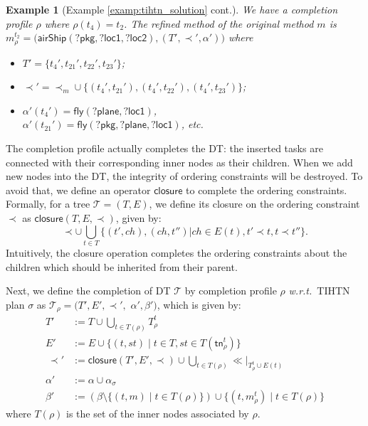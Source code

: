 \documentclass[letterpaper]{article} %
\newtheorem{examp}{Example}
\newcommand{\tn}{\mathsf{tn}}
\newcommand{\plan}{\sigma}
\newcommand{\Dtree}{\mathcal{T}}
\newcommand{\Tasksof}{T}
\newcommand{\aspprec}{\ll}
\newcommand{\improveFunction}{\rho}
\newcommand{\closure}{\mathsf{closure}}
\begin{document}
\begin{examp}[Example \ref{examp:tihtn_solution} cont.]
We have a completion profile $\improveFunction$ where $\improveFunction(t_4)\!=\!t_2$. %
The refined method of the original method $m$ is $m_\improveFunction^{t_2}{=}\mathsf{(airShip(?pkg{,}?loc1{,}?loc2)},(T'{,}{\prec}'{,}\alpha'))$ where
\begin{itemize}
\item $T' = \{t_4',t_{21}',t_{22}',t_{23}'\}$;
\item $\prec' = \prec_m \cup \{(t_4',t_{21}'),(t_4',t_{22}'),(t_4',t_{23}')\}$;
\item $\alpha'(t_4') = \mathsf{fly(?plane,?loc1)}$,\\ $\alpha'(t_{21}')= \mathsf{fly(?pkg,?plane,?loc1)}$, etc.
\end{itemize}
\end{examp}

The completion profile actually completes the DT: the inserted tasks are connected with their corresponding inner nodes as their children.
When we add new nodes into the DT, the integrity of ordering constraints will be destroyed.
To avoid that, we define an operator $\closure$ to complete the ordering constraints.
Formally, for a tree $\Dtree=(T,E)$, we define its closure on the ordering constraint $\prec$ as $\closure(T,E,\prec)$, given by:
  $$
  \prec \cup  \bigcup_{t\in T}\{(t',ch),(ch,t'')| ch \in E(t), t'\prec t, t\prec t''\}.$$
Intuitively, the closure operation completes the ordering constraints about the children which should be inherited from their parent.

Next, %
we define the completion of DT $\Dtree$ by completion profile $\improveFunction$ \emph{w.r.t.}\ TIHTN plan $\plan$ as $\Dtree_\improveFunction = (T',E',{\prec',}$ $\alpha',\beta')$, which is given by:
\begin{align*}
  T' &:= T \cup  \textstyle \bigcup_{t \in \Tasksof(\improveFunction)} T_\improveFunction^t \\
  E' &:= E \cup  \{(t,st)\mid t\in T, st\in\Tasksof(\tn_\improveFunction^t)\} \\
  \ \prec'\! &:= \closure(T',E',\prec) \cup \textstyle \bigcup_{t\in\Tasksof(\improveFunction)}\aspprec\!\!|_{T^t_\improveFunction \cup E(t)}\\
  \alpha' &:= \alpha \cup \alpha_{\plan}\\
  \beta' &:= (\beta \setminus \{(t,m)\mid t \in \Tasksof(\improveFunction)\}) \cup \{(t,m_\improveFunction^t)\mid t \in \Tasksof(\improveFunction)\}
\end{align*}
where $\Tasksof(\improveFunction)$ is the set of the inner nodes associated by $\improveFunction$.
\end{document}

